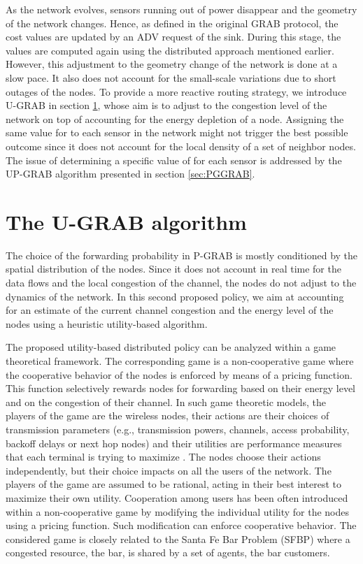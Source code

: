 \documentclass[journal, peerreview, onecolumn, draftcls]{IEEEtran}
\begin{document}
As the network evolves, sensors running out of power disappear and the geometry of the network changes. Hence, as defined in the original GRAB protocol, the cost values are updated by an ADV request of the sink. During this stage, the  values are computed again using the distributed approach mentioned earlier. However, this adjustment to the geometry change of the network is done at a slow pace. It also does not account for the small-scale variations due to short outages of the nodes. To provide a more reactive routing strategy, we introduce U-GRAB in section \ref{sec:GGRAB}, whose aim is to adjust to the congestion level of the network on top of accounting for the energy depletion of a node.
Assigning the same value for  to each sensor in the network might not trigger the best possible outcome since it does not account for the local density of a set of neighbor nodes. The issue of determining a specific value of  for each sensor is addressed by the UP-GRAB algorithm presented in section \ref{sec:PGGRAB}.

\section{The U-GRAB algorithm}\label{sec:GGRAB}

The choice of the forwarding probability in P-GRAB is mostly conditioned by the spatial distribution of the nodes. Since it does not account in real time for the data flows and the local congestion of the channel, the nodes do not adjust to the dynamics of the network. In this second proposed policy, we aim at accounting for an estimate of the current channel congestion and the energy level of the nodes using a heuristic utility-based algorithm.

The proposed utility-based distributed policy can be analyzed within a game theoretical framework. The corresponding game is a non-cooperative game where the cooperative behavior of the nodes is enforced by means of a pricing function. This function selectively rewards nodes for forwarding based on their energy level and on the congestion of their channel. In such game theoretic models, the players of the game are the wireless nodes, their actions are their choices of transmission parameters (e.g., transmission powers, channels, access probability, backoff delays or next hop nodes) and their utilities are performance measures that each terminal is trying to maximize \cite{comaniciu07}. The nodes choose their actions independently, but their choice impacts on all the users of the network. The players of the game are assumed to be rational, acting in their best interest to maximize their own utility.
Cooperation among users has been often introduced within a non-cooperative game by modifying the individual utility for the nodes using a pricing function. Such modification can enforce cooperative behavior.
The considered game is closely related to the Santa Fe Bar Problem (SFBP)\cite{mishra} where a congested resource, the bar, is shared by a set of agents, the bar customers.
\end{document}
